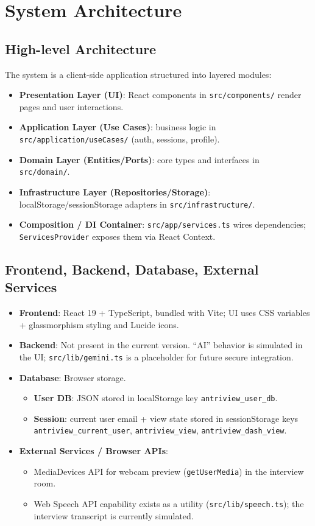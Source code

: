 \documentclass[11pt]{article}
\begin{document}
\section{System Architecture}

\subsection{High-level Architecture}
The system is a client-side application structured into layered modules:
\begin{itemize}[leftmargin=1.2em]
  \item \textbf{Presentation Layer (UI)}: React components in \texttt{src/components/} render pages and user interactions.
  \item \textbf{Application Layer (Use Cases)}: business logic in \texttt{src/application/useCases/} (auth, sessions, profile).
  \item \textbf{Domain Layer (Entities/Ports)}: core types and interfaces in \texttt{src/domain/}.
  \item \textbf{Infrastructure Layer (Repositories/Storage)}: localStorage/sessionStorage adapters in \texttt{src/infrastructure/}.
  \item \textbf{Composition / DI Container}: \texttt{src/app/services.ts} wires dependencies; \texttt{ServicesProvider} exposes them via React Context.
\end{itemize}

\subsection{Frontend, Backend, Database, External Services}
\begin{itemize}[leftmargin=1.2em]
  \item \textbf{Frontend}: React 19 + TypeScript, bundled with Vite; UI uses CSS variables + glassmorphism styling and Lucide icons.
  \item \textbf{Backend}: Not present in the current version. ``AI'' behavior is simulated in the UI; \texttt{src/lib/gemini.ts} is a placeholder for future secure integration.
  \item \textbf{Database}: Browser storage.
  \begin{itemize}[leftmargin=1.2em]
    \item \textbf{User DB}: JSON stored in localStorage key \texttt{antriview\_user\_db}.
    \item \textbf{Session}: current user email + view state stored in sessionStorage keys \texttt{antriview\_current\_user}, \texttt{antriview\_view}, \texttt{antriview\_dash\_view}.
  \end{itemize}
  \item \textbf{External Services / Browser APIs}:
  \begin{itemize}[leftmargin=1.2em]
    \item MediaDevices API for webcam preview (\texttt{getUserMedia}) in the interview room.
    \item Web Speech API capability exists as a utility (\texttt{src/lib/speech.ts}); the interview transcript is currently simulated.
  \end{itemize}
\end{itemize}
\end{document}
